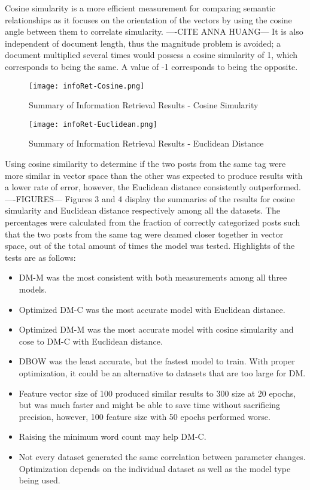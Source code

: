 Cosine simularity is a more efficient measurement for comparing semantic relationships as it focuses on the orientation of the vectors by using the cosine angle between them to correlate simularity. ----CITE ANNA HUANG--- It is also independent of document length, thus the magnitude problem is avoided; a document multiplied several times would possess a cosine simularity of 1, which corresponds to being the same. A value of -1 corresponds to being the opposite. 

\begin{figure}[ht]
\caption{Summary of Information Retrieval Results - Cosine Simularity}
\label{results_of_information_retrieval_cosine}
\centering
\texttt{[image: infoRet-Cosine.png]}
\end{figure}

\begin{figure}[ht]
\caption{Summary of Information Retrieval Results - Euclidean Distance}
\label{results_of_information_retrieval_euclidean}
\centering
\texttt{[image: infoRet-Euclidean.png]}
\end{figure}

Using cosine similarity to determine if the two posts from the same tag were more similar in vector space than the other was expected to produce results with a lower rate of error, however, the Euclidean distance consistently outperformed.  ----FIGURES---  Figures 3 and 4 display the summaries of the results for cosine simularity and Euclidean distance respectively among all the datasets. The percentages were calculated from the fraction of correctly categorized posts such that the two posts from the same tag were deamed closer together in vector space, out of the total amount of times the model was tested. Highlights of the tests are as follows:

\begin{itemize}
  \item DM-M was the most consistent with both measurements among all three models. 
  \item Optimized DM-C was the most accurate model with Euclidean distance.
  \item Optimized DM-M was the most accurate model with cosine simularity and cose to DM-C with Euclidean distance.
  \item DBOW was the least accurate, but the fastest model to train. With proper optimization, it could be an alternative to datasets that are too large for DM.
  \item Feature vector size of 100 produced similar results to 300 size at 20 epochs, but was much faster and might be able to save time without sacrificing precision, however, 100 feature size with 50 epochs performed worse.
  \item Raising the minimum word count may help DM-C.
  \item Not every dataset generated the same correlation between parameter changes. Optimization depends on the individual dataset as well as the model type being used.
\end{itemize}

